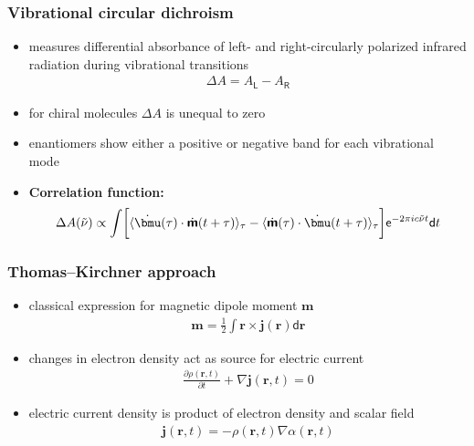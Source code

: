 \documentclass[t]{beamer}
\begin{document}
	\begin{frame}
	    \frametitle{Vibrational circular dichroism}
	    \begin{itemize}
	        \item measures differential absorbance of left- and right-circularly polarized infrared radiation during vibrational transitions
	        \begin{align*}
	            \Delta A = A_\mathsf{L} - A_\mathsf{R}
	        \end{align*}
	        \item for chiral molecules $\Delta A$ is unequal to zero
	        \item enantiomers show either a positive or negative band for each vibrational mode
	        \item \textbf{Correlation function:} 
			\begin{align*}
				\Delta A (\tilde{\nu}) \propto \int \biggl[\langle \dot{\bmu} (\tau) \cdot \dot{\boldsymbol{\mathsf{m}}} (t + \tau) \rangle_{\tau} - \langle \dot{\boldsymbol{\mathsf{m}}} (\tau) \cdot \dot{\bmu} (t + \tau) \rangle_{\tau} \biggl] \mathsf{e}^{-2\pi i c \tilde{\nu} t}\mathsf{d}t
			\end{align*}
	    \end{itemize}
	\end{frame}
	\begin{frame}
	    \frametitle{Thomas--Kirchner approach}
	    \begin{itemize}
	        \item classical expression for magnetic dipole moment $\mathbf{m}$
	        \begin{align*}
	            \mathbf{m} = \frac{1}{2} \int \mathbf{r} \times \mathbf{j}(\mathbf{r}) \mathsf{d}\mathbf{r}
	        \end{align*}
	        \pause
	        \item changes in electron density act as source for electric current
	        \begin{align*}
	            \frac{\partial \rho (\mathbf{r},t)}{\partial t} + \nabla \mathbf{j}(\mathbf{r},t) = 0
	        \end{align*}
	        \pause
	        \item electric current density is product of electron density and scalar field
	        \begin{align*} 
	        \mathbf{j}(\mathbf{r},t) = -\rho (\mathbf{r},t) \nabla \alpha(\mathbf{r},t)
			\end{align*}
	    \end{itemize}
	\end{frame}
\end{document}
